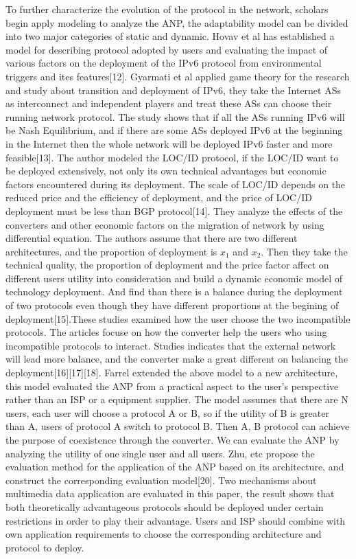 \documentclass{article}
\begin{document}
To further characterize the evolution of the protocol in the network, scholars begin apply modeling to analyze the
ANP, the adaptability model can be divided into two major categories of static and dynamic. Hovav et al has established
a model for describing protocol adopted by users and evaluating the impact of various factors on the deployment
of the IPv6 protocol from environmental triggers and ites features[12]. Gyarmati et al applied game theory for
the research and study about transition and deployment of IPv6, they take the Internet ASs as interconnect and
independent players and treat these ASs can choose their running network protocol. The study shows that if all
the ASs running IPv6 will be Nash Equilibrium, and if there are some ASs deployed IPv6 at the beginning in the
Internet then the whole network will be deployed IPv6 faster and more feasible[13]. The author modeled the LOC/ID
protocol, if the LOC/ID want to be deployed extensively, not only its own technical advantages but economic factors
encountered during its deployment. The scale of LOC/ID depends on the reduced price and the efficiency of deployment,
and the price of LOC/ID deployment must be less than BGP protocol[14]. They analyze the effects of the converters and
other economic factors on the migration of network by using differential equation. The authors assume that there are
two different architectures, and the proportion of deployment is
\(x_{1}\) and \(x_{2}\).
Then they take the technical quality, the proportion of deployment and the price factor affect on different users
utility into consideration and build a dynamic economic model of technology deployment. And find than there is a
balance during the deployment of two protocols even though they have different proportions at the begining of
deployment[15].These studies examined how the user choose the two incompatible protocols. The articles focuse
on how the converter help the users who using incompatible protocols to interact. Studies indicates that the external
network will lead more balance, and the converter make a great different on balancing the deployment[16][17][18].
Farrel extended the above model to a new architecture, this model evaluated the ANP from a practical aspect to the
user's perspective rather than an ISP or a equipment supplier. The model assumes that there are N users, each user
will choose a protocol A or B, so if the utility of B is greater than A, users of protocol A switch to protocol B.
Then A, B protocol can achieve the purpose of coexistence through the converter. We can evaluate the ANP by analyzing
the utility of one single user and all users. Zhu, etc propose the evaluation method for the application of the
ANP based on its architecture, and construct the corresponding evaluation model[20]. Two mechanisms about multimedia
data application are evaluated in this paper, the result shows that both theoretically advantageous protocols should
be deployed under certain restrictions in order to play their advantage. Users and ISP should combine with own
application requirements to choose the corresponding architecture and protocol to deploy.
\end{document}
